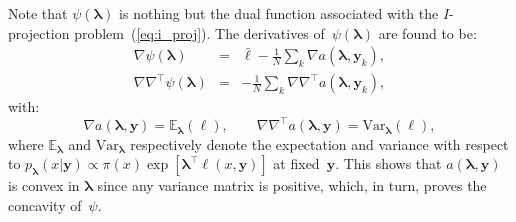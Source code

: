 \documentclass[english]{scrartcl}
\def\y{{\mathbf{y}}}
\newcommand{\blambda}{{\boldsymbol{\lambda}}}
\newcommand{\bell}{{\boldsymbol{\ell}}}
\newcommand{\E}{\mathbb{E}}
\begin{document}
Note that $\psi(\blambda)$ is nothing but the dual function associated with the $I$-projection problem~(\ref{eq:i_proj}). The derivatives of~$\psi(\blambda)$ are found to be:
\begin{eqnarray*}
\nabla\psi(\blambda)
 & = & \bar{\bell} - \frac{1}{N} \sum_k \nabla a(\blambda,\y_k), \\
\nabla\nabla^\top\psi(\blambda)
 & = & - \frac{1}{N} \sum_k \nabla \nabla^\top a(\blambda,\y_k),
\end{eqnarray*}
with:
$$
\nabla a(\blambda,\y) = \E_{\blambda}(\bell),
\qquad
\nabla \nabla^\top a(\blambda,\y) = \text{Var}_{\blambda}(\bell),
$$
where $\E_{\blambda}$ and $\text{Var}_{\blambda}$ respectively denote the expectation and variance with respect to $p_\blambda(x|\y)\propto \pi(x)\exp[\blambda^\top \bell(x,\y)]$ at fixed~$\y$. This shows that $a(\blambda,\y)$ is convex in $\blambda$ since any variance matrix is positive, which, in turn, proves the concavity of~$\psi$.





\end{document}
